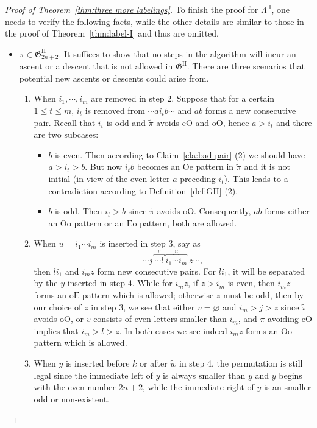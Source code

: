 \documentclass[11pt,reqno]{amsart}
\numberwithin{equation}{section}
\theoremstyle{plain}
\theoremstyle{definition}
\newcommand{\fG}{\mathfrak{G}}
\newcommand{\GII}{\fG^{\mathrm{II}}}
\newcommand{\LII}{\Lambda^{\mathrm{II}}}
\def\oO{\mathrm{oO}}
\def\oE{\mathrm{oE}}
\def\eO{\mathrm{eO}}
\def\Oo{\mathrm{Oo}}
\def\Eo{\mathrm{Eo}}
\def\Oe{\mathrm{Oe}}
\begin{document}
\begin{proof}[Proof of Theorem~\ref{thm:three more labelings}]
    To finish the proof for $\LII$, one needs to verify the following facts, while the other details are similar to those in the proof of Theorem~\ref{thm:label-I} and thus are omitted.
    \begin{itemize}
    	\item $\pi\in\GII_{2n+2}$. It suffices to show that no steps in the algorithm will incur an ascent or a descent that is not allowed in $\GII$. There are three scenarios that potential new ascents or descents could arise from. 
    	\begin{enumerate}
    		\item When $i_1,\cdots,i_m$ are removed in step 2. Suppose that for a certain $1\le t\le m$, $i_t$ is removed from $\cdots ai_tb\cdots$ and $ab$ forms a new consecutive pair. Recall that $i_t$ is odd and $\tilde{\pi}$ avoids $\eO$ and $\oO$, hence $a>i_t$ and there are two subcases:
    		\begin{itemize}
    			\item $b$ is even. Then according to Claim~\ref{cla:bad pair} (2) we should have $a>i_t>b$. But now $i_tb$ becomes an $\Oe$ pattern in $\tilde{\pi}$ and it is not initial (in view of the even letter $a$ preceding $i_t$). This leads to a contradiction according to Definition~\ref{def:GII} (2).
    			\item $b$ is odd. Then $i_t>b$ since $\tilde{\pi}$ avoids $\oO$. Consequently, $ab$ forms either an $\Oo$ pattern or an $\Eo$ pattern, both are allowed.
    		\end{itemize}
    		
    		\item When $u=i_1\cdots i_m$ is inserted in step 3, say as 
    		$$\cdots j~\overbracket{\cdots l}^{v}~\overbracket{i_1\cdots i_m}^{u}~z\cdots,$$ 
    		then $li_1$ and $i_mz$ form new consecutive pairs. For $li_1$, it will be separated by the $y$ inserted in step 4. While for $i_mz$, if $z>i_m$ is even, then $i_mz$ forms an $\oE$ pattern which is allowed; otherwise $z$ must be odd, then by our choice of $z$ in step 3, we see that either $v=\varnothing$ and $i_m>j>z$ since $\tilde{\pi}$ avoids $\oO$, or $v$ consists of even letters smaller than $i_m$, and $\tilde{\pi}$ avoiding $\eO$ implies that $i_m>l>z$. In both cases we see indeed $i_mz$ forms an $\Oo$ pattern which is allowed.
    		
    		\item When $y$ is inserted before $k$ or after $\tilde{w}$ in step 4, the permutation is still legal since the immediate left of $y$ is always smaller than $y$ and $y$ begins with the even number $2n+2$, while the immediate right of $y$ is an smaller odd or non-existent. 
    	\end{enumerate}
    	

\end{itemize}
\end{proof}
\end{document}
